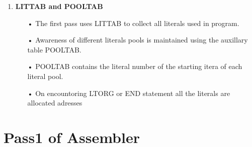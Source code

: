 \documentclass{scrreprt}
\begin{document}
\begin{enumerate}
\item \textbf{LITTAB and POOLTAB}
\begin{itemize}
\item[•]The first pass uses LITTAB to collect all literals used in program.
\item[•]Awareness of different literals pools is maintained using the auxillary table POOLTAB.
\item[•]POOLTAB contains the literal number of the starting itera of each literal pool.
\item[•]On encountoring LTORG or END statement all the literals are allocated adresses
\end{itemize}
\end{enumerate}

\section{Pass1 of Assembler}
\end{document}
